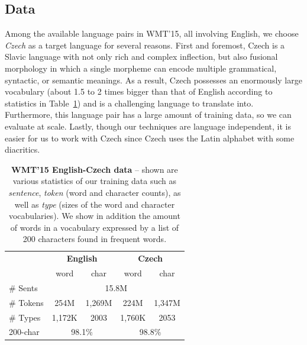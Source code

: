 \subsection{Data}
Among the available language pairs in WMT'15, all involving English, 
we choose {\it Czech} as a target language for several reasons. First and
foremost, Czech is a Slavic language with not only rich
and complex inflection,
but also fusional morphology in which a single morpheme can encode multiple
grammatical, syntactic, or semantic meanings. As a result, Czech possesses an enormously large
vocabulary (about 1.5 to 2 times bigger than that of English according to 
statistics in Table~\ref{t:data}) and is a challenging language to translate
into. Furthermore, this language pair has a large
amount of training data, so %
we can evaluate at scale. Lastly, though our techniques are language
independent, it is easier for us to work with Czech since Czech uses the Latin alphabet with some
diacritics. %

\begin{table} %
\centering
\begin{tabular}{l|c|c|c|c}
& \multicolumn{2}{c|}{\bf{English}} & \multicolumn{2}{c}{\bf{Czech}}\\
  \cline{2-5}
& word & char & word & char \\
  \hline
  \# Sents & \multicolumn{4}{c}{15.8M} \\
  \hdashline
  \# Tokens & 254M & 1,269M & 224M & 1,347M \\ 
 \hdashline
  \# Types & 1,172K & 2003 & 1,760K & 2053\\ 
  \hline
  200-char & \multicolumn{2}{c|}{98.1\%} & \multicolumn{2}{c}{98.8\%} \\
\end{tabular}
\caption[WMT'15 English-Czech data]{{\bf WMT'15 English-Czech data} -- shown are various statistics of our training
data such as {\it sentence}, {\it token} (word and character counts), as well as
{\it type} (sizes of the word and character vocabularies).
We show in addition the amount of words in a vocabulary expressed by a list of 200 characters found
in frequent words.}
\label{t:data}
\end{table}

